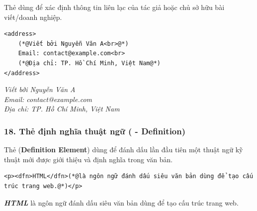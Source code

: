 Thẻ  dùng để xác định thông tin liên lạc của tác giả hoặc chủ sở hữu bài viết/doanh nghiệp.

\begin{codeWindow}
\begin{lstlisting}[language=HTML5]
<address>
    (*@Viết bởi Nguyễn Văn A<br>@*)
    Email: contact@example.com<br>
    (*@Địa chỉ: TP. Hồ Chí Minh, Việt Nam@*)
</address>
\end{lstlisting}
\end{codeWindow}

\begin{tcolorbox}[
    enhanced, colback=white, colframe=primaryBlue!20, arc=6pt, boxrule=0.8pt, drop shadow=black!3!white,
    top=8pt, bottom=8pt, left=12pt, right=12pt,
    title={\sffamily\bfseries\scriptsize\color{codeComment} KẾT QUẢ HIỂN THỊ TRÊN TRÌNH DUYỆT (BROWSER PREVIEW)},
    coltitle=codeComment, colbacktitle=codeBg!80!white
]
{\itshape
Viết bởi Nguyễn Văn A\\
Email: contact@example.com\\
Địa chỉ: TP. Hồ Chí Minh, Việt Nam
}
\end{tcolorbox}

\subsubsection{18. Thẻ định nghĩa thuật ngữ ( - Definition)}

Thẻ  (\textbf{Definition Element}) dùng để đánh dấu lần đầu tiên một thuật ngữ kỹ thuật mới được giới thiệu và định nghĩa trong văn bản.

\begin{codeWindow}
\begin{lstlisting}[language=HTML5]
<p><dfn>HTML</dfn>(*@là ngôn ngữ đánh dấu siêu văn bản dùng để tạo cấu trúc trang web.@*)</p>
\end{lstlisting}
\end{codeWindow}

\begin{tcolorbox}[
    enhanced, colback=white, colframe=primaryBlue!20, arc=6pt, boxrule=0.8pt, drop shadow=black!3!white,
    top=8pt, bottom=8pt, left=12pt, right=12pt,
    title={\sffamily\bfseries\scriptsize\color{codeComment} KẾT QUẢ HIỂN THỊ TRÊN TRÌNH DUYỆT (BROWSER PREVIEW)},
    coltitle=codeComment, colbacktitle=codeBg!80!white
]
\textbf{\textit{HTML}} là ngôn ngữ đánh dấu siêu văn bản dùng để tạo cấu trúc trang web.
\end{tcolorbox}

